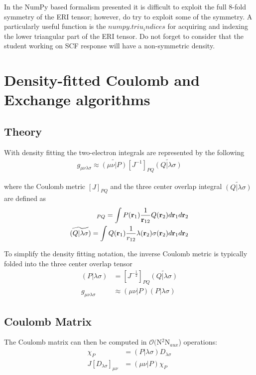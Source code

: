 \documentclass[aip,jcp,preprint,superscriptaddress,floatfix]{revtex4-1}
\begin{document}
In the NumPy based formalism presented it is difficult to exploit the full 8-fold symmetry of the ERI tensor; however, do try to exploit some of the symmetry.
A particularly useful function is the $numpy.triu_indices$ for acquiring and indexing the lower triangular part of the ERI tensor.
Do not forget to consider that the student working on SCF response will have a non-symmetric density.

\section{Density-fitted Coulomb and Exchange algorithms}

\subsection{Theory}
With density fitting\cite{Weigend:2002ga, Vahtras:1993db, Dunlap:1979gh, Whitten:1973ju} the two-electron integrals are represented by the following
\begin{eqnarray}
g_{\mu \nu \lambda \sigma} \approx \widetilde{(\mu \nu |P)} [J^{-1}]_{PQ} \widetilde{(Q| \lambda \sigma)}
\end{eqnarray}


where the Coulomb metric $[J]_{PQ}$ and the three center overlap integral $\widetilde{(Q| \lambda \sigma)} $ are defined as
\begin{eqnarray}
[J]_{PQ} = \int P({\bf r}_1) \frac{1}{{\bf r}_{12}}Q({\bf r}_2)d{\bf r}_1d{\bf r}_2\\
\widetilde{(Q| \lambda \sigma)} = \int Q({\bf r}_1)\frac{1}{r_{12}} \lambda({\bf r}_2) \sigma({\bf r}_2)d{\bf r}_1d{\bf r}_2
\end{eqnarray}

To simplify the density fitting notation, the inverse Coulomb metric is typically folded into the three center overlap tensor
\begin{align}
(P| \lambda \sigma) &= [J^{-\frac{1}{2}}]_{PQ} \widetilde{(Q| \lambda \sigma)}\\
g_{\mu \nu \lambda \sigma} &\approx (\mu \nu |P) (P| \lambda \sigma)
\end{align}

\subsection{Coulomb Matrix}
The Coulomb matrix can then be computed in $\mathcal{O}($N$^2$N$_{aux}$) operations:
\begin{align}
\chi_P &= (P| \lambda \sigma) D_{ \lambda \sigma} \\
J[D_{ \lambda \sigma}]_{\mu \nu} &= (\mu \nu |P) \chi_P
\end{align}
\end{document}
